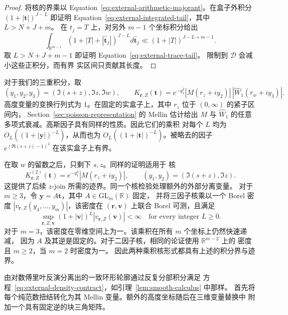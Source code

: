 \documentclass[11pt,a4paper]{article}
\numberwithin{equation}{section}
\numberwithin{figure}{section}
\theoremstyle{definition}
\theoremstyle{remark}
\begin{document}
\begin{proof}
将核的界乘以
Equation~\eqref{eq:external-arithmetic-majorant}。在盒子外积分
$(1+|\boldsymbol t|)^{J-L}$ 即证明
Equation~\eqref{eq:external-integrated-tail}，其中 $L>N+J+m$。
在 $t_j=T$ 上，对另外 $m-1$ 个坐标积分给出
\[
 \int_{\mathbb R^{m-1}}
 (1+|T|+|\widehat{\boldsymbol t}_j|)^{J-L}
 d\widehat{\boldsymbol t}_j
 \ll(1+|T|)^{J-L+m-1}.
\]
取 $L>N+J+m-1$ 即证明 Equation~\eqref{eq:external-trace-tail}。
限制到 $\mathcal D$ 会减小这些正积分，而有界
实区间只贡献其长度。
\end{proof}

对于我们的三重积分，取
\[
 (y_1,y_2,y_3)=(\Im(s+z),\Im z,\Im w),\qquad
 K_{\boldsymbol r,Z}(\boldsymbol t)
 =e^{-y_1^2}|M(r_z+iy_2)|\,|\widehat W_1(r_w+iy_3)|.
\]
高度变量的变换行列式为 1。在固定的实盒子上，其中 $r_z$ 位于 $(0,\infty)$ 的紧子区间内，
Section~\ref{sec:poisson-representation} 的 Mellin 估计给出 $M$ 与
$\widehat W_1$ 的任意多项式衰减。高斯因子具有同样的性质。因此它们的乘积
对每个 $L$ 均为 $O_L((1+|\boldsymbol y|)^{-L})$，从而也为
$O_L((1+|\boldsymbol t|)^{-L})$。被略去的因子
$e^{(\Re(s+z)-1)^2}$ 在该实盒子上有界。

在取 $w$ 的留数之后，只剩下 $s,z$。同样的证明适用于
核
\begin{equation}
 K^{(2)}_{\boldsymbol r,Z}(\boldsymbol t)
 =e^{-y_1^2}|M(r_z+iy_2)|,
 \qquad(y_1,y_2)=(\Im(s+z),\Im z).
 \label{eq:external-two-dimensional-kernel}
\end{equation}
这提供了后续 $z$-join 所需的迹界。同一个核检验处理额外的外部分离变量。
对于 $m\ge3$，令 $\boldsymbol y=A\boldsymbol t$，其中 $A\in\mathrm{GL}_m(\mathbb R)$ 固定，
并将三因子核乘以一个 Borel 密度 $|v_{\boldsymbol r,Z}(y_4,\ldots,y_m)|$，该密度在
$(\boldsymbol r,\boldsymbol v)$ 上联合 Borel 可测，且满足
\begin{equation}
 \sup_{\boldsymbol r,Z,\boldsymbol v}
 (1+|\boldsymbol v|)^L|v_{\boldsymbol r,Z}(\boldsymbol v)|<\infty
 \quad\text{for every integer }L\ge0.
 \label{eq:external-density-contract}
\end{equation}
对于 $m=3$，该密度在零维空间上为一。该乘积在所有 $m$ 个坐标上仍然快速递减，
因为 $A$ 及其逆是固定的。对于二因子核，相同的论证使用 $\mathbb R^{m-2}$ 上的
密度且 $m\ge2$，当 $m=2$ 时密度为一。
因此两种乘积核形式都具有上述的积分界与迹界。

由对数傅里叶反演分离出的一致环形轮廓通过反复分部积分满足
方程~\eqref{eq:external-density-contract}，如引理~\ref{lem:smooth-calculus} 中那样。
首先将每个纯范数扭结转化为其 Mellin 变量。额外的高度坐标随后在三维变量替换中
附加一个具有固定逆的块三角矩阵。
\end{document}
